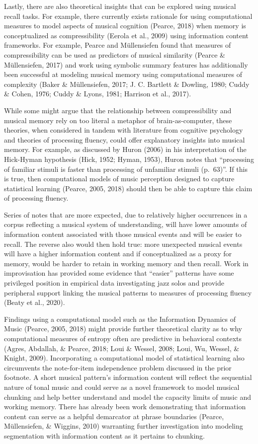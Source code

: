 \documentclass[english,man,floatsintext]{apa6}
\begin{document}
Lastly, there are also theoretical insights that can be explored using musical recall tasks.
For example, there currently exists rationale for using computational measures to model aspects of musical cognition (Pearce, 2018) when memory is conceptualized as compressibility (Eerola et al., 2009) using information content frameworks.
For example, Pearce and Müllensiefen found that measures of compressibility can be used as predictors of musical similarity (Pearce \& Müllensiefen, 2017) and work using symbolic summary features has additionally been successful at modeling musical memory using computational measures of complexity (Baker \& Müllensiefen, 2017; J. C. Bartlett \& Dowling, 1980; Cuddy \& Cohen, 1976; Cuddy \& Lyons, 1981; Harrison et al., 2017).

While some might argue that the relationship between compressibility and musical memory rely on too literal a metaphor of brain-as-computer, these theories, when considered in tandem with literature from cognitive psychology and theories of processing fluency, could offer explanatory insights into musical memory.
For example, as discussed by Huron (2006) in his interpretation of the Hick-Hyman hypothesis (Hick, 1952; Hyman, 1953), Huron notes that \enquote{processing of familiar stimuli is faster than processing of unfamiliar stimuli (p.~63)}.
If this is true, then computational models of music perception designed to capture statistical learning (Pearce, 2005, 2018) should then be able to capture this claim of processing fluency.

Series of notes that are more expected, due to relatively higher occurrences in a corpus reflecting a musical system of understanding, will have lower amounts of information content associated with those musical events and will be easier to recall.
The reverse also would then hold true: more unexpected musical events will have a higher information content and if conceptualized as a proxy for memory, would be harder to retain in working memory and then recall.
Work in improvisation has provided some evidence that \enquote{easier} patterns have some privileged position in empirical data investigating jazz solos and provide peripheral support linking the musical patterns to measures of processing fluency (Beaty et al., 2020).

Findings using a computational model such as the Information Dynamics of Music (Pearce, 2005, 2018) might provide further theoretical clarity as to why computational measures of entropy often are predictive in behavioral contexts (Agres, Abdallah, \& Pearce, 2018; Loui \& Wessel, 2008; Loui, Wu, Wessel, \& Knight, 2009).
Incorporating a computational model of statistical learning also circumvents the note-for-item independence problem discussed in the prior footnote.
A short musical pattern's information content will reflect the sequential nature of tonal music and could serve as a novel framework to model musical chunking and help better understand and model the capacity limits of music and working memory.
There has already been work demonstrating that information content can serve as a helpful demarcator at phrase boundaries (Pearce, Müllensiefen, \& Wiggins, 2010) warranting further investigation into modeling segmentation with information content as it pertains to chunking.
\end{document}
